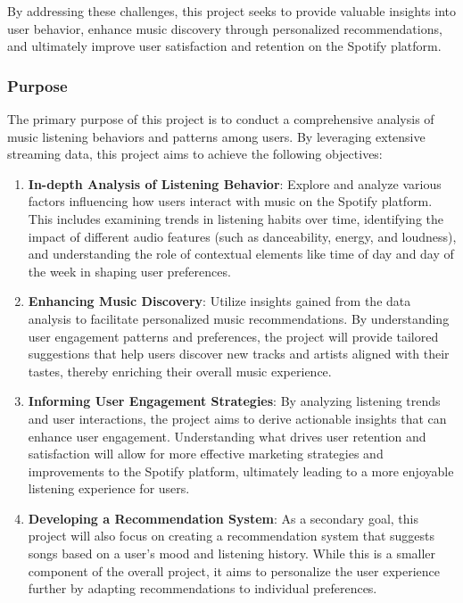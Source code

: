 \documentclass[
]{article}
\begin{document}
By addressing these challenges, this project seeks to provide valuable
insights into user behavior, enhance music discovery through
personalized recommendations, and ultimately improve user satisfaction
and retention on the Spotify platform.

\subsubsection{Purpose}\label{purpose}

The primary purpose of this project is to conduct a comprehensive
analysis of music listening behaviors and patterns among users. By
leveraging extensive streaming data, this project aims to achieve the
following objectives:

\begin{enumerate}
\def\labelenumi{\arabic{enumi}.}
\item
  \textbf{In-depth Analysis of Listening Behavior}: Explore and analyze
  various factors influencing how users interact with music on the
  Spotify platform. This includes examining trends in listening habits
  over time, identifying the impact of different audio features (such as
  danceability, energy, and loudness), and understanding the role of
  contextual elements like time of day and day of the week in shaping
  user preferences.
\item
  \textbf{Enhancing Music Discovery}: Utilize insights gained from the
  data analysis to facilitate personalized music recommendations. By
  understanding user engagement patterns and preferences, the project
  will provide tailored suggestions that help users discover new tracks
  and artists aligned with their tastes, thereby enriching their overall
  music experience.
\item
  \textbf{Informing User Engagement Strategies}: By analyzing listening
  trends and user interactions, the project aims to derive actionable
  insights that can enhance user engagement. Understanding what drives
  user retention and satisfaction will allow for more effective
  marketing strategies and improvements to the Spotify platform,
  ultimately leading to a more enjoyable listening experience for users.
\item
  \textbf{Developing a Recommendation System}: As a secondary goal, this
  project will also focus on creating a recommendation system that
  suggests songs based on a user's mood and listening history. While
  this is a smaller component of the overall project, it aims to
  personalize the user experience further by adapting recommendations to
  individual preferences.
\end{enumerate}
\end{document}
